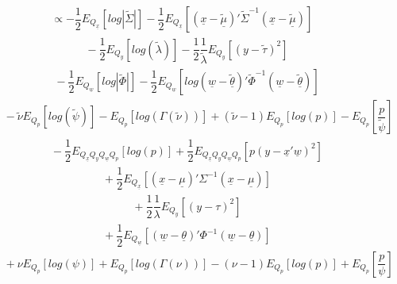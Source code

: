 \documentclass[fleqn]{minimal}
\begin{document}
\begin{align*}
  \ \ \ \ \ \
  \propto
  -\dfrac{1}{2}
  E_{Q_{\underline{x}}} \left[
    log \left| \tilde{\Sigma} \right|
  \right]
  -\dfrac{1}{2}
  E_{Q_{\underline{x}}} \left[
    \left( \underline{x} - \underline{\tilde{\mu}}\right)'
    \tilde{\Sigma}^{-1}
    \left( \underline{x} - \underline{\tilde{\mu}}\right)
  \right]
\end{align*}
\begin{align*}
  \ \ \ \ \ \ \ \ \ \
  -\dfrac{1}{2}
  E_{Q_{y}} \left[
    log \left(
      \tilde{\lambda}
    \right)
  \right]
  -\dfrac{1}{2}
  \dfrac{1}{\tilde{\lambda}}
  E_{Q_{y}} \left[
    \left(y - \tilde{\tau}\right)^2
  \right]
\end{align*}
\begin{align*}
  \ \ \ \ \ \ \ \ \ \
  - \dfrac{1}{2}
  E_{Q_{\underline{w}}} \left[
    log \left| \tilde{\Phi} \right|
  \right]
  - \dfrac{1}{2}
  E_{Q_{\underline{w}}} \left[
    log 
    \left( \underline{w} - \underline{\tilde{\theta}}\right)'
    \tilde{\Phi}^{-1}
    \left( \underline{w} - \underline{\tilde{\theta}}\right)
  \right]
\end{align*}
\begin{align*}
  \ \ \ \ \ \ \ \ \ \
  -
  \tilde{\nu}
  E_{Q_{p}} \left[
    log \left(
      \tilde{\psi}
    \right)
  \right]
  -
  E_{Q_{p}} \left[
    log \left(
      \Gamma(\tilde{\nu})
    \right)
  \right]
  +
  \left( \tilde{\nu}-1 \right)
  E_{Q_{p}} \left[
    log \left(
      p
    \right)
  \right]
  - 
  E_{Q_{p}} \left[
    \dfrac{p}{\tilde{\psi}}
  \right]
\end{align*}
\begin{align*}
  \ \ \ \ \ \ \ \ \ \
  - \dfrac{1}{2}
  E_{Q_{\underline{x}} Q_{y} Q_{\underline{w}} Q_{p}}
  \left[
    log \left(
      p
    \right)
  \right]
  + \dfrac{1}{2}
  E_{Q_{\underline{x}} Q_{y} Q_{\underline{w}} Q_{p}}
  \left[
    p
    \left( y - \underline{x}'\underline{w}\right)^2
  \right]
\end{align*}
\begin{align*}
  \ \ \ \ \ \ \ \ \ \
  +\dfrac{1}{2}
  E_{Q_{\underline{x}}} \left[
    \left( \underline{x} - \underline{\mu}\right)'
    \Sigma^{-1}
    \left( \underline{x} - \underline{\mu}\right)
  \right]
\end{align*}
\begin{align*}
  \ \ \ \ \ \ \ \ \ \
  +\dfrac{1}{2}
  \dfrac{1}{\lambda}
  E_{Q_{y}} \left[
    \left(y - \tau\right)^2
  \right]
\end{align*}
\begin{align*}
  \ \ \ \ \ \ \ \ \ \
  + \dfrac{1}{2}
  E_{Q_{\underline{w}}} \left[
    \left( \underline{w} - \underline{\theta}\right)'
    \Phi^{-1}
    \left( \underline{w} - \underline{\theta}\right)
  \right]
\end{align*}
\begin{align*}
  \ \ \ \ \ \ \ \ \ \
  +
  \nu
  E_{Q_{p}} \left[
    log \left(
      \psi
    \right)
  \right]
  +
  E_{Q_{p}} \left[
    log \left(
      \Gamma(\nu)
    \right)
  \right]
  -
  \left( \nu-1 \right)
  E_{Q_{p}} \left[
    log \left(
      p
    \right)
  \right]
  + 
  E_{Q_{p}} \left[
    \dfrac{p}{\psi}
  \right]
\end{align*}
\end{document}
